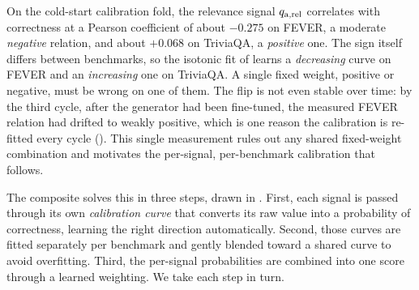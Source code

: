 \begin{bythenumbers}
On the cold-start calibration fold, the relevance signal $q_{\text{a,rel}}$ correlates with
correctness at a Pearson coefficient of about $-0.275$ on FEVER, a moderate
\emph{negative} relation, and about $+0.068$ on TriviaQA, a \emph{positive} one. The
sign itself differs between benchmarks, so the isotonic fit of
 learns a \emph{decreasing} curve on FEVER and an
\emph{increasing} one on TriviaQA. A single fixed weight, positive or negative, must
be wrong on one of them. The flip is not even stable over time: by the third cycle,
after the generator had been fine-tuned, the measured FEVER relation had drifted to
weakly positive, which is one reason the calibration is re-fitted every cycle
(). This single measurement rules out any shared
fixed-weight combination and motivates the per-signal, per-benchmark calibration that
follows.
\end{bythenumbers}

The composite solves this in three steps, drawn in .
First, each signal is passed through its own \emph{calibration curve} that converts
its raw value into a probability of correctness, learning the right direction
automatically. Second, those curves are fitted separately per benchmark and gently
blended toward a shared curve to avoid overfitting. Third, the per-signal
probabilities are combined into one score through a learned weighting. We take each
step in turn.


